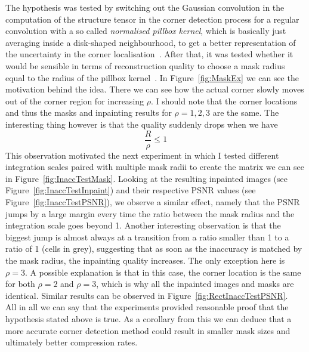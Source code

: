 \newpage\noindent The hypothesis was tested by switching out the Gaussian
convolution in the computation of the structure tensor in the corner detection process for a
regular convolution with a so called \textit{normalised pillbox kernel}, which is basically just
averaging inside a disk-shaped neighbourhood, to get a better representation of the uncertainty in
the corner localisation~\cite{conversation}. After that, it was tested whether it would be
sensible in terms of reconstruction quality to choose a mask radius equal to the radius of the
pillbox kernel~\cite{conversation}. 
In Figure~\ref{fig:MaskEx} we can see the motivation behind the
idea. There we can see how the actual corner slowly moves out of the corner region for increasing
$\rho$. I should note that the corner locations and thus the masks and inpainting results for
$\rho=1,2,3$ are the same. The interesting thing however is that the quality suddenly drops when we 
have 
\begin{equation}
    \frac{R}{\rho}\leq1
\end{equation}
This observation motivated the next experiment in which I tested different integration scales
paired with multiple mask radii to create the matrix we can see in Figure~\ref{fig:InaccTestMask}.
Looking at the resulting inpainted images (see Figure~\ref{fig:InaccTestInpaint}) and their
respective PSNR values (see Figure~\ref{fig:InaccTestPSNR}), we observe a similar effect, namely
that the PSNR jumps by a large margin every time the ratio between the mask radius and the
integration scale goes beyond 1.
Another interesting observation is that the biggest jump is almost
always at a transition from a ratio smaller than 1 to a ratio of 1 (cells in grey), suggesting that
as soon as the inaccuracy is matched by the mask radius, the inpainting quality increases. The only
exception here is $\rho=3$. A possible explanation is that in this case, the corner
location is the same for both $\rho=2$ and $\rho=3$, which is why all the inpainted images and
masks are identical. Similar results can be observed in
Figure~\ref{fig:RectInaccTestPSNR}.\\
All in all we can say that the experiments provided reasonable proof that the hypothesis stated
above is true. As a corollary from this we can deduce that a more accurate corner detection method
could result in smaller mask sizes and ultimately better compression rates.
